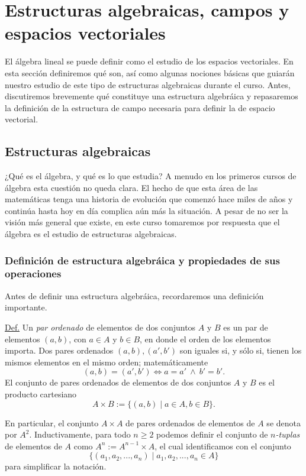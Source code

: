 \documentclass[apuntes]{subfiles}
\begin{document}
\section{Estructuras algebraicas, campos y espacios vectoriales} \label{Sec: Estructuras algebráicas, campos y espacios vectoriales}

El álgebra lineal se puede definir como el estudio de los espacios vectoriales. En esta sección definiremos qué son, así como algunas nociones básicas que guiarán nuestro estudio de este tipo de estructuras algebraicas durante el curso. Antes, discutiremos brevemente qué constituye una estructura algebráica y repasaremos la definición de la estructura de campo \textemdash necesaria para definir la de espacio vectorial.

\subsection*{Estructuras algebraicas} \label{Subsec: Estructuras algebráicas}

¿Qué es el álgebra, y qué es lo que estudia? A menudo en los primeros cursos de álgebra esta cuestión no queda clara. El hecho de que esta área de las matemáticas tenga una historia de evolución que comenzó hace miles de años y continúa hasta hoy en día complica aún más la situación. A pesar de no ser la visión más general que existe, en este curso tomaremos por respuesta que el álgebra es el estudio de estructuras algebraicas.

\subsubsection*{Definición de estructura algebráica y propiedades de sus operaciones} \label{Sssec: Definición de estructura algebráica y propiedades de sus operaciones}

Antes de definir una estructura algebráica, recordaremos una definición importante.

\begin{tcolorbox}\label{Def: Par ordenado}
    \underline{Def.} Un \emph{par ordenado} de elementos de dos conjuntos $A$ y $B$ es un par de elementos $(a,b)$, con $a\in A$ y $b\in B$, en donde el orden de los elementos importa. Dos pares ordenados $(a,b), (a',b')$ son iguales si, y sólo si, tienen los mismos elementos en el mismo orden; matemáticamente
    \[
    (a,b)=(a',b')\iff a=a' \ \land \ b'=b'.
    \]
    El conjunto de pares ordenados de elementos de dos conjuntos $A$ y $B$ es el producto cartesiano
    \[
    A\times B:= \{(a,b) \mid a\in A, b\in B\}.
    \] 

    En particular, el conjunto $A\times A$ de pares ordenados de elementos de $A$ se denota por $A^2$. Inductivamente, para todo $n\ge 2$ podemos definir el conjunto de \emph{$n$-tuplas} de elementos de $A$ como $A^n:= A^{n-1}\times A$, el cual identificamos con el conjunto
    \[
        \{(a_1,a_2,...,a_n) \mid a_1,a_2,...,a_n\in A\}
    \] 
    para simplificar la notación.
        
\end{tcolorbox}
\end{document}
